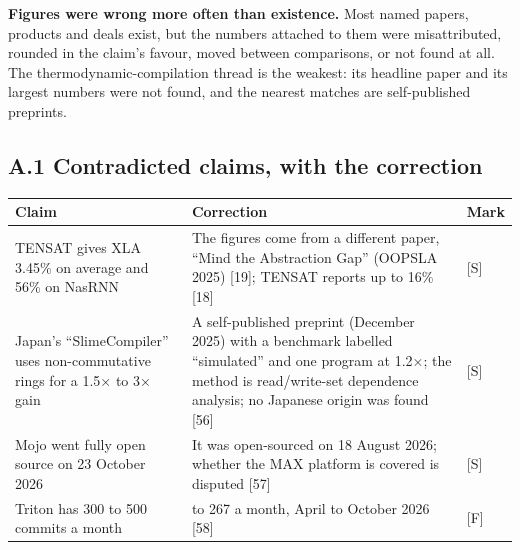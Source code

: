 \documentclass[10pt,letterpaper]{article}
\begin{document}
\textbf{Figures were wrong more often than existence.} Most named
papers, products and deals exist, but the numbers attached to them were
misattributed, rounded in the claim's favour, moved between comparisons,
or not found at all. The thermodynamic-compilation thread is the
weakest: its headline paper and its largest numbers were not found, and
the nearest matches are self-published preprints.

\subsection{A.1 Contradicted claims, with the
correction}\label{a.1-contradicted-claims-with-the-correction}

{\footnotesize\setlength{\tabcolsep}{3.8pt}\renewcommand{\arraystretch}{1.15}
\begin{longtable}[]{@{}
  >{\raggedright\arraybackslash}p{}
  >{\raggedright\arraybackslash}p{}
  >{\raggedright\arraybackslash}p{}@{}}
\toprule\noalign{}
\begin{minipage}[b]{\linewidth}\raggedright
\textbf{Claim}
\end{minipage} & \begin{minipage}[b]{\linewidth}\raggedright
\textbf{Correction}
\end{minipage} & \begin{minipage}[b]{\linewidth}\raggedright
\textbf{Mark}
\end{minipage} \\
\midrule\noalign{}
\endhead
\bottomrule\noalign{}
\endlastfoot
TENSAT gives XLA 3.45\% on average and 56\% on NasRNN & The figures come
from a different paper, ``Mind the Abstraction Gap'' (OOPSLA 2025)
{[}19{]}; TENSAT reports up to 16\% {[}18{]} & {[}S{]} \\
Japan's ``SlimeCompiler'' uses non-commutative rings for a 1.5× to 3×
gain & A self-published preprint (December 2025) with a benchmark
labelled ``simulated'' and one program at 1.2×; the method is
read/write-set dependence analysis; no Japanese origin was found
{[}56{]} & {[}S{]} \\
Mojo went fully open source on 23 October 2026 & It was open-sourced on
18 August 2026; whether the MAX platform is covered is disputed {[}57{]}
& {[}S{]} \\
Triton has 300 to 500 commits a month & 159 to 267 a month, April to
October 2026 {[}58{]} & {[}F{]} \\
\end{longtable}
}
\end{document}
